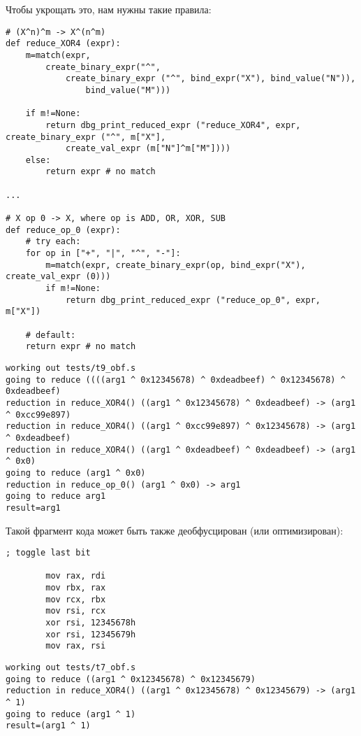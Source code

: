 Чтобы укрощать это, нам нужны такие правила:

\begin{lstlisting}
# (X^n)^m -> X^(n^m)
def reduce_XOR4 (expr):
    m=match(expr, 
        create_binary_expr("^",
            create_binary_expr ("^", bind_expr("X"), bind_value("N")),
                bind_value("M")))
    
    if m!=None:
        return dbg_print_reduced_expr ("reduce_XOR4", expr, create_binary_expr ("^", m["X"], 
            create_val_expr (m["N"]^m["M"])))
    else:
        return expr # no match

...

# X op 0 -> X, where op is ADD, OR, XOR, SUB
def reduce_op_0 (expr):
    # try each:
    for op in ["+", "|", "^", "-"]:
        m=match(expr, create_binary_expr(op, bind_expr("X"), create_val_expr (0)))
        if m!=None:
            return dbg_print_reduced_expr ("reduce_op_0", expr, m["X"])

    # default:
    return expr # no match
\end{lstlisting}

\begin{lstlisting}
working out tests/t9_obf.s
going to reduce ((((arg1 ^ 0x12345678) ^ 0xdeadbeef) ^ 0x12345678) ^ 0xdeadbeef)
reduction in reduce_XOR4() ((arg1 ^ 0x12345678) ^ 0xdeadbeef) -> (arg1 ^ 0xcc99e897)
reduction in reduce_XOR4() ((arg1 ^ 0xcc99e897) ^ 0x12345678) -> (arg1 ^ 0xdeadbeef)
reduction in reduce_XOR4() ((arg1 ^ 0xdeadbeef) ^ 0xdeadbeef) -> (arg1 ^ 0x0)
going to reduce (arg1 ^ 0x0)
reduction in reduce_op_0() (arg1 ^ 0x0) -> arg1
going to reduce arg1
result=arg1
\end{lstlisting}

Такой фрагмент кода может быть также деобфусцирован (или оптимизирован):

\begin{lstlisting}
; toggle last bit

        mov rax, rdi
        mov rbx, rax
        mov rcx, rbx
        mov rsi, rcx
        xor rsi, 12345678h
        xor rsi, 12345679h
        mov rax, rsi
\end{lstlisting}

\begin{lstlisting}
working out tests/t7_obf.s
going to reduce ((arg1 ^ 0x12345678) ^ 0x12345679)
reduction in reduce_XOR4() ((arg1 ^ 0x12345678) ^ 0x12345679) -> (arg1 ^ 1)
going to reduce (arg1 ^ 1)
result=(arg1 ^ 1)
\end{lstlisting}


